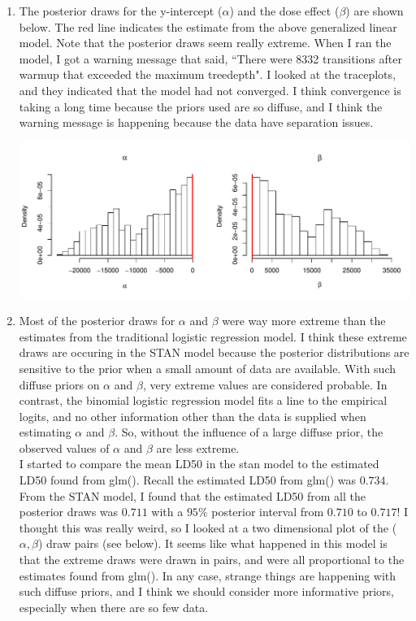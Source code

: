 \documentclass[12pt]{article}\usepackage[]{graphicx}\usepackage[]{color}
\newenvironment{knitrout}{}{} %
\begin{document}
\begin{enumerate}
\begin{enumerate}
\item The posterior draws for the y-intercept ($\alpha$) and the dose effect ($\beta$) are shown below. The red line indicates the estimate from the above generalized linear model. Note that the posterior draws seem really extreme. When I ran the model, I got a warning message that said, ``There were 8332 transitions after warmup that exceeded the maximum treedepth". I looked at the traceplots, and they indicated that the model  had not converged. I think convergence is taking a long time because the priors used are so diffuse, and I think the warning message is happening because the data have separation issues.

\begin{knitrout}\footnotesize
{}\color{fgcolor}
\includegraphics[width=\linewidth]{figure/compare-1} 

\end{knitrout}

\item Most of the posterior draws for $\alpha$ and $\beta$ were way more extreme than the estimates from the traditional logistic regression model. I think these extreme draws are occuring in the STAN model because the posterior distributions are sensitive to the prior when a small amount of data are available. With such diffuse priors on $\alpha$ and $\beta$, very extreme values are considered probable. In contrast, the binomial logistic regression model fits a line to the empirical logits, and no other information other than the data is supplied when estimating $\alpha$ and $\beta$. So, without the influence of a large diffuse prior, the observed values of $\alpha$ and $\beta$ are less extreme. \\

I started to compare the mean LD50 in the stan model to the estimated LD50 found from glm(). Recall the estimated LD50 from glm() was $0.734$. From the STAN model, I found that the estimated LD50 from all the posterior draws was $0.711$ with a $95\%$ posterior interval from $0.710$ to $0.717$! I thought this was really weird, so I looked at a two dimensional plot of the ($\alpha, \beta$) draw pairs (see below). It seems like what happened in this model is that the extreme draws were drawn in pairs, and were all proportional to the estimates found from glm(). In any case, strange things are happening with such diffuse priors, and I think we should consider more informative priors, especially when there are so few data.


\end{enumerate}
\end{enumerate}
\end{document}
